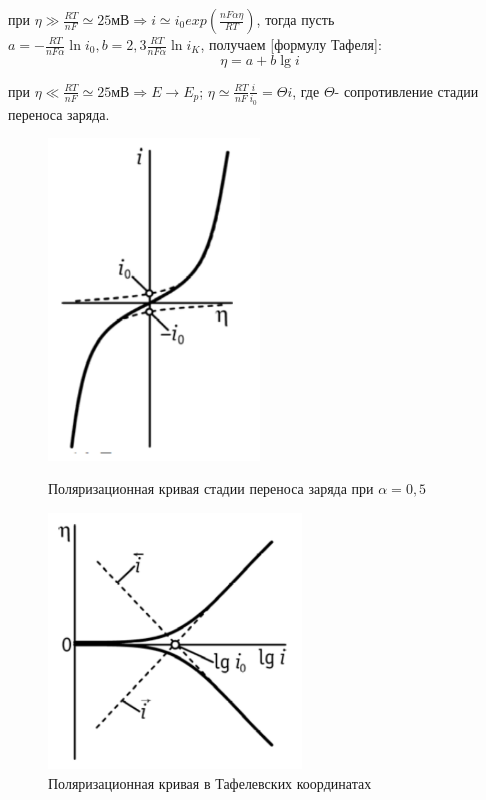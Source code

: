 \documentclass[a4paper,12pt]{article}
\begin{document}
при $\eta \gg \frac{RT}{nF} \simeq 25\text{мВ} \Rightarrow i \simeq i_0exp(\frac{nF\alpha\eta}{RT})$, тогда пусть $a = -\frac{RT}{nF\alpha}\ln{i_0}, b = 2,3\frac{RT}{nF\alpha}\ln{i_K}$, получаем [формулу Тафеля]:
\[ \eta = a +b\lg{i} \]

при $\eta \ll \frac{RT}{nF} \simeq 25\text{мВ} \Rightarrow E \to E_p$; $\eta \simeq \frac{RT}{nF}\frac{i}{i_0} = \Theta{i}$,
где $\Theta$- сопротивление стадии переноса заряда.

\begin{figure}[h!]
\begin{center}
\begin{minipage}[h!]{0.45\linewidth}
\includegraphics[width = 0.5\textwidth]{Б-Ф.png}
\caption{Поляризационная кривая стадии переноса заряда при $\alpha = 0,5$}
\label{fig:no_int}
\end{minipage}
\hfill
\begin{minipage}[h]{0.45\linewidth}
\includegraphics[width = 0.6\textwidth]{Тафель.png}
\caption{Поляризационная кривая в Тафелевских координатах}
\label{fig:no_int}
\end{minipage}
\end{center}
\end{figure}
\end{document}
